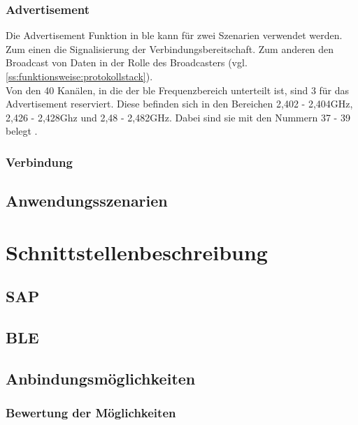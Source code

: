 \subsubsection{Advertisement}
\label{sss:funktionsweise:advertisement}

Die Advertisement Funktion in \ac{ble} kann für zwei Szenarien verwendet werden. Zum einen die Signalisierung der Verbindungsbereitschaft. Zum anderen den Broadcast von Daten in der Rolle des Broadcasters (vgl. \ref{ss:funktionsweise:protokollstack}).\\

\noindent Von den 40 Kanälen, in die der \ac{ble} Frequenzbereich unterteilt ist, sind 3 für das Advertisement reserviert. Diese befinden sich in den Bereichen 2,402 - 2,404GHz, 2,426 - 2,428Ghz und 2,48 - 2,482GHz. Dabei sind sie mit den Nummern 37 - 39 belegt \cite[Seite 16]{Townsend14:GSB}.\\

\subsubsection{Verbindung}
\label{sss:funktionsweise:verbindung}   

\subsection{Anwendungsszenarien}
\label{ss:funktionsweise:anwendungen}

\section{Schnittstellenbeschreibung}
\label{s:interface} 

\subsection{SAP}
\label{ss:interface:sap}

\subsection{BLE}
\label{ss:interface:ble}

\subsection{Anbindungsmöglichkeiten}
\label{ss:interface:connect}

\subsubsection{Bewertung der Möglichkeiten}
\label{sss:interface:connect:eval}

